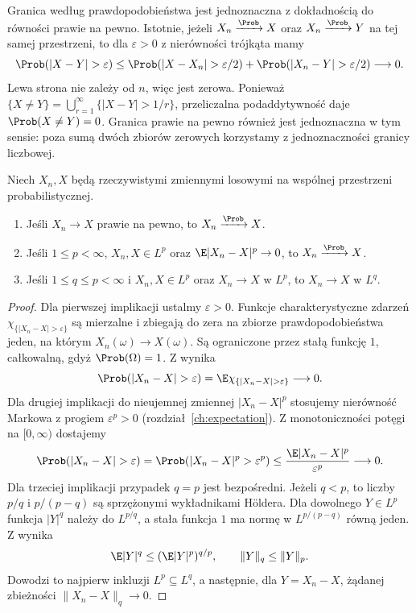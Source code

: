 Granica według prawdopodobieństwa jest jednoznaczna
z dokładnością do równości prawie na pewno.
Istotnie, jeżeli $X_n\xrightarrow{\Prob}X$ oraz
$X_n\xrightarrow{\Prob}Y$ na tej samej przestrzeni,
to dla $\varepsilon>0$ z nierówności trójkąta mamy
\[
\Prob(|X-Y|>\varepsilon)
\leq\Prob(|X-X_n|>\varepsilon/2)
+\Prob(|X_n-Y|>\varepsilon/2)\longrightarrow0.
\]
Lewa strona nie zależy od $n$, więc jest zerowa.
Ponieważ $\{X\ne Y\}=\bigcup_{r=1}^\infty
\{|X-Y|>1/r\}$, przeliczalna podaddytywność daje
$\Prob(X\ne Y)=0$. Granica prawie na pewno również
jest jednoznaczna w tym sensie: poza sumą dwóch
zbiorów zerowych korzystamy z jednoznaczności
granicy liczbowej.

\begin{twierdzenie}
Niech $X_n,X$ będą rzeczywistymi zmiennymi losowymi
na wspólnej przestrzeni probabilistycznej.
\begin{enumerate}
\item Jeśli $X_n\to X$ prawie na pewno, to
 $X_n\xrightarrow{\Prob}X$.
\item Jeśli $1\leq p<\infty$, $X_n,X\in L^p$ oraz
 $\E|X_n-X|^p\to0$, to $X_n\xrightarrow{\Prob}X$.
\item Jeśli $1\leq q\leq p<\infty$ i $X_n,X\in L^p$ oraz
 $X_n\to X$ w $L^p$, to $X_n\to X$ w $L^q$.
\end{enumerate}
\end{twierdzenie}
\begin{proof}
Dla pierwszej implikacji ustalmy $\varepsilon>0$.
Funkcje charakterystyczne zdarzeń
$\chi_{\{|X_n-X|>\varepsilon\}}$ są mierzalne
i zbiegają do zera na zbiorze prawdopodobieństwa jeden,
na którym $X_n(\omega)\to X(\omega)$.
Są ograniczone przez stałą funkcję $1$, całkowalną,
gdyż $\Prob(\Omega)=1$.
Z 
wynika
\[
\Prob(|X_n-X|>\varepsilon)
=\E\chi_{\{|X_n-X|>\varepsilon\}}\longrightarrow0.
\]
Dla drugiej implikacji do nieujemnej zmiennej
$|X_n-X|^p$ stosujemy nierówność Markowa z progiem
$\varepsilon^p>0$ (rozdział~\ref{ch:expectation}).
Z monotoniczności potęgi na $[0,\infty)$ dostajemy
\[
\Prob(|X_n-X|>\varepsilon)
=\Prob(|X_n-X|^p>\varepsilon^p)
\leq\frac{\E|X_n-X|^p}{\varepsilon^p}\longrightarrow0.
\]
Dla trzeciej implikacji przypadek $q=p$ jest bezpośredni.
Jeżeli $q<p$, to liczby $p/q$ i $p/(p-q)$
są sprzężonymi wykładnikami Höldera. Dla dowolnego
$Y\in L^p$ funkcja $|Y|^q$ należy do $L^{p/q}$,
a stała funkcja $1$ ma normę w $L^{p/(p-q)}$
równą jeden. Z 
wynika
\[
\E|Y|^q\leq(\E|Y|^p)^{q/p},
\qquad \|Y\|_q\leq\|Y\|_p.
\]
Dowodzi to najpierw inkluzji $L^p\subseteq L^q$,
a następnie, dla $Y=X_n-X$, żądanej zbieżności
$\|X_n-X\|_q\to0$.
\end{proof}


